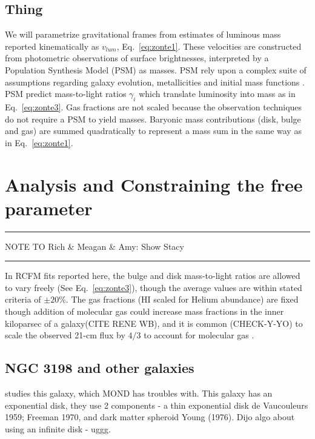 \documentclass[reprint,%
 amsmath,amssymb,
 aps,
]{revtex4-1}
\begin{document}
  
  \subsection{Thing}
We will parametrize gravitational frames from estimates of luminous mass reported kinematically as  $v_{lum}$, Eq.~\ref{eq:zonte1}. These velocities  are constructed from photometric observations of surface brightnesses, interpreted   by a Population Synthesis Model (PSM)\cite{10.1093/mnras/sty3223} as     masses. 
PSM rely upon a complex  suite of  assumptions regarding galaxy evolution, metallicities and initial mass functions  \cite{BelldYong,10.1093/mnras/sty3223}. PSM predict   mass-to-light ratios  $\gamma_i$
 which translate  luminosity into mass as in Eq.~\ref{eq:zonte3}. 
Gas fractions are  not scaled because the observation techniques do not require a PSM to yield masses.  Baryonic mass contributions (disk, bulge and gas) are summed quadratically to represent a mass sum in the same way as in   Eq.~\ref{eq:zonte1}.


  
 
\section{Analysis and Constraining the free parameter \label{sec:analysis}}
{\color{blue} \rule{\linewidth}{0.5mm}}
 {\color{blue} NOTE TO Rich & Meagan & Amy: Show Stacy  }
{\color{blue} \rule{\linewidth}{0.5mm}}

  

In RCFM fits reported here, the    bulge and disk mass-to-light ratios are allowed to vary freely (See Eq.~\ref{eq:zonte3}), though the average values are within stated criteria   \cite{2016Lelli} of $\pm 20\%$. The gas fractions (HI scaled for Helium abundance) are fixed though addition of molecular gas could increase mass fractions in the inner kiloparsec of a galaxy(CITE RENE WB), and it is common (CHECK-Y-YO) to scale the observed 21-cm flux by $4/3$ to account for molecular gas \cite{2004ApJ...609..652M}.


\subsection{NGC 3198 and other galaxies}
\cite{1985ApJAlbada} studies this galaxy, which MOND has troubles with. This galaxy has an exponential disk, they use 2 components -  a thin exponential disk de Vaucouleurs 1959;
Freeman 1970, and dark matter spheroid Young (1976). Dijo algo about using an infinite disk - uggg. 
 
\end{document}
